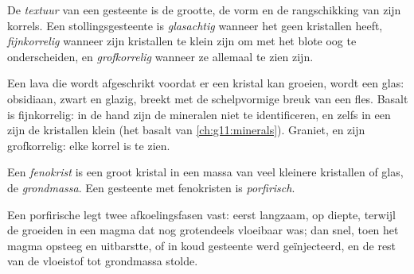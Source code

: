 \begin{definition}[Textuur]\label{def:g11:igneous-rocks:texture}
De \emph{textuur} van een gesteente is de grootte, de vorm
en de rangschikking van zijn korrels. Een stollingsgesteente is \emph{glasachtig} wanneer het
geen kristallen heeft, \emph{fijnkorrelig} wanneer zijn kristallen te klein zijn om met het
blote oog te onderscheiden, en \emph{grofkorrelig} wanneer ze allemaal
te zien zijn.
\end{definition}

Een lava die wordt afgeschrikt voordat er een kristal kan groeien, wordt een glas: obsidiaan, zwart
en glazig, breekt met de schelpvormige breuk van een fles. Basalt is
fijnkorrelig: in de hand zijn de mineralen niet te identificeren, en zelfs in een
 zijn de kristallen klein (het basalt van \cref{ch:g11:minerals}).
Graniet,  en  zijn grofkorrelig: elke korrel is te zien.

\begin{definition}\label{def:g11:igneous-rocks:porphyritic}
Een \emph{fenokrist} is een groot kristal in een massa van
veel kleinere kristallen of glas, de \emph{grondmassa}. Een gesteente met
fenokristen is \emph{porfirisch}.
\end{definition}

Een porfirische  legt twee afkoelingsfasen vast: eerst langzaam, op diepte,
terwijl de  groeiden in een magma dat nog grotendeels vloeibaar was; dan
snel, toen het magma opsteeg en uitbarstte, of in koud gesteente werd geïnjecteerd, en
de rest van de vloeistof tot grondmassa stolde.

